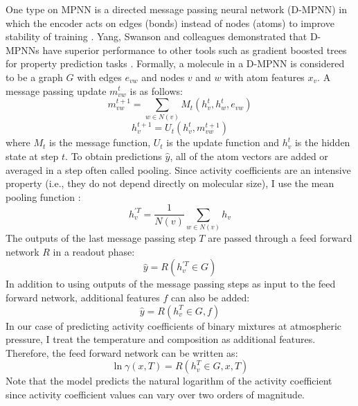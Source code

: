 One type on MPNN is a directed message passing neural network (D-MPNN) in which the encoder acts on edges (bonds) instead of nodes (atoms) to improve stability of training \cite{Yang2019}. Yang, Swanson and colleagues demonstrated that D-MPNNs have superior performance to other tools such as gradient boosted trees for property prediction tasks \cite{Yang2019}. Formally, a molecule in a D-MPNN is considered to be a graph $G$ with edges $e_{vw}$ and nodes $v$ and $w$ with atom features $x_v$. A message passing update $m_{vw}^{t}$ is as follows:
\begin{equation}
    m_{vw}^{t+1} = \sum_{w\in N(v)} M_t(h_v^t, h_w^t, e_{vw})
\end{equation}
\begin{equation}
    h_v^{t+1} = U_t(h_v^t, m_{vw}^{t+1})
\end{equation}
where $M_t$ is the message function, $U_t$ is the update function and $h_v^{t}$ is the hidden state at step $t$. To obtain predictions $\hat y$, all of the atom vectors are added or averaged in a step often called pooling. Since activity coefficients are an intensive property (i.e., they do not depend directly on molecular size), I use the mean pooling function \cite{Schweidtmann2023}:
\begin{equation}
    h_v^{'T} = \frac{1}{N(v)} \sum_{w\in N(v)} h_v
\end{equation}
The outputs of the last message passing step $T$ are passed through a feed forward network $R$ in a readout phase:
 \begin{equation}
    \hat y = R(h_v^{'T} \in G)
\end{equation}
In addition to using outputs of the message passing steps as input to the feed forward network, additional features $f$ can also be added:
\begin{equation}
    \hat y = R(h_v^T \in G, f)
\end{equation}
In our case of predicting activity coefficients of binary mixtures at atmospheric pressure, I treat the temperature and composition as additional features. Therefore, the feed forward network can be written as:
\begin{equation}
   \ln \gamma(x,T)= R(h_v^T \in G, x, T)
\end{equation}
Note that the model predicts the natural logarithm of the activity coefficient since activity coefficient values can vary over two orders of magnitude.


